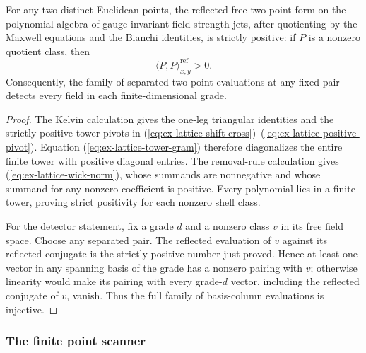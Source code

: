 \begin{theorem}
\label{thm:ex-lattice-all-grade-free-detector}
For any two distinct Euclidean points, the reflected free two-point form on
the polynomial algebra of gauge-invariant field-strength jets, after
quotienting by the Maxwell equations and the Bianchi identities, is
strictly positive: if $P$ is a nonzero quotient class, then
\[
 \langle P,P\rangle_{x,y}^{\mathrm{ref}}>0.
\]
Consequently, the family of separated two-point evaluations at any fixed
pair detects every field in each finite-dimensional grade.
\end{theorem}

\begin{proof}
The Kelvin calculation gives the one-leg triangular identities and the
strictly positive tower pivots in
(\ref{eq:ex-lattice-shift-cross})--(\ref{eq:ex-lattice-positive-pivot}).
Equation (\ref{eq:ex-lattice-tower-gram}) therefore diagonalizes the
entire finite tower with positive diagonal entries. The removal-rule
calculation gives (\ref{eq:ex-lattice-wick-norm}), whose summands are
nonnegative and whose summand for any nonzero coefficient is positive.
Every polynomial lies in a finite tower, proving strict positivity for
each nonzero shell class.

For the detector statement, fix a grade $d$ and a nonzero class $v$ in its
free field space. Choose any separated pair. The reflected evaluation of
$v$ against its reflected conjugate is the strictly positive number just
proved. Hence at least one vector in any spanning basis of the grade has a
nonzero pairing with $v$; otherwise linearity would make its pairing with
every grade-$d$ vector, including the reflected conjugate of $v$, vanish.
Thus the full family of basis-column evaluations is injective.
\end{proof}

\subsubsection{The finite point scanner}


